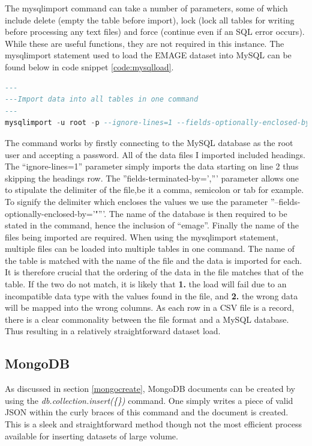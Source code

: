 The mysqlimport command can take a number of parameters, some of which include delete (empty the table before import), lock (lock all tables for writing before processing any text files) and force (continue even if an SQL error occurs). While these are useful functions, they are not required in this instance. The mysqlimport statement used to load the EMAGE dataset into MySQL can be found below in code snippet \ref{code:mysqlload}.
\begin{lstlisting}[language=SQL, caption=Command used to load data into the MySQL database., label=code:mysqlload]
---
---Import data into all tables in one command
---
mysqlimport -u root -p --ignore-lines=1 --fields-optionally-enclosed-by='"' --fields-terminated-by=',' emage assays.csv publications.csv sources.csv specimens.csv stages.csv textannotations.csv genes.csv anatomystructures.csv
\end{lstlisting}
\parindent 0pt
The command works by firstly connecting to the MySQL database as the root user and accepting a password. All of the data files I imported included headings. The ``ignore-lines=1'' parameter simply imports the data starting on line 2 thus skipping the headings row. The ''fields-terminated-by=',''' parameter allows one to stipulate the delimiter of the file,be it a comma, semicolon or tab for example. To signify the delimiter which encloses the values we use the parameter ''--fields-optionally-enclosed-by='"'''. The name of the database is then required to be stated in the command, hence the inclusion of ``emage''. Finally the name of the files being imported are required. When using the mysqlimport statement, multiple files can be loaded into multiple tables in one command. The name of the table is matched with the name of the file and the data is imported for each. It is therefore crucial that the ordering of the data in the file matches that of the table. If the two do not match, it is likely that \textbf{1.} the load will fail due to an incompatible data type with the values found in the file, and \textbf{2.} the wrong data will be mapped into the wrong columns. As each row in a CSV file is a record, there is a clear commonality between the file format and a MySQL database. Thus resulting in a relatively straightforward dataset load.
\parindent 15pt

\subsection{MongoDB}\label{mongoload}
As discussed in section \ref{mongocreate}, MongoDB documents can be created by using the \textit{db.collection.insert(\{\})} command. One simply writes a piece of valid JSON within the curly braces of this command and the document is created. This is a sleek and straightforward method though not the most efficient process available for inserting datasets of large volume.

